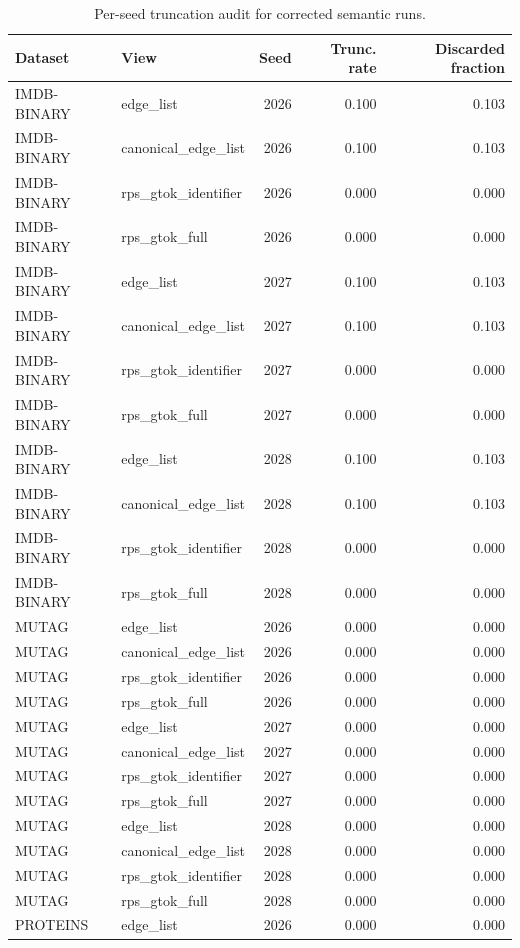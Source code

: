 \begin{table}[t]
\centering
\caption{Per-seed truncation audit for corrected semantic runs.}
\begin{tabular}{llrrr}
\toprule
Dataset & View & Seed & Trunc. rate & Discarded fraction \\
\midrule
IMDB-BINARY & edge_list & 2026 & 0.100 & 0.103 \\
IMDB-BINARY & canonical_edge_list & 2026 & 0.100 & 0.103 \\
IMDB-BINARY & rps_gtok_identifier & 2026 & 0.000 & 0.000 \\
IMDB-BINARY & rps_gtok_full & 2026 & 0.000 & 0.000 \\
IMDB-BINARY & edge_list & 2027 & 0.100 & 0.103 \\
IMDB-BINARY & canonical_edge_list & 2027 & 0.100 & 0.103 \\
IMDB-BINARY & rps_gtok_identifier & 2027 & 0.000 & 0.000 \\
IMDB-BINARY & rps_gtok_full & 2027 & 0.000 & 0.000 \\
IMDB-BINARY & edge_list & 2028 & 0.100 & 0.103 \\
IMDB-BINARY & canonical_edge_list & 2028 & 0.100 & 0.103 \\
IMDB-BINARY & rps_gtok_identifier & 2028 & 0.000 & 0.000 \\
IMDB-BINARY & rps_gtok_full & 2028 & 0.000 & 0.000 \\
MUTAG & edge_list & 2026 & 0.000 & 0.000 \\
MUTAG & canonical_edge_list & 2026 & 0.000 & 0.000 \\
MUTAG & rps_gtok_identifier & 2026 & 0.000 & 0.000 \\
MUTAG & rps_gtok_full & 2026 & 0.000 & 0.000 \\
MUTAG & edge_list & 2027 & 0.000 & 0.000 \\
MUTAG & canonical_edge_list & 2027 & 0.000 & 0.000 \\
MUTAG & rps_gtok_identifier & 2027 & 0.000 & 0.000 \\
MUTAG & rps_gtok_full & 2027 & 0.000 & 0.000 \\
MUTAG & edge_list & 2028 & 0.000 & 0.000 \\
MUTAG & canonical_edge_list & 2028 & 0.000 & 0.000 \\
MUTAG & rps_gtok_identifier & 2028 & 0.000 & 0.000 \\
MUTAG & rps_gtok_full & 2028 & 0.000 & 0.000 \\
PROTEINS & edge_list & 2026 & 0.000 & 0.000 \\

\end{tabular}
\end{table}
